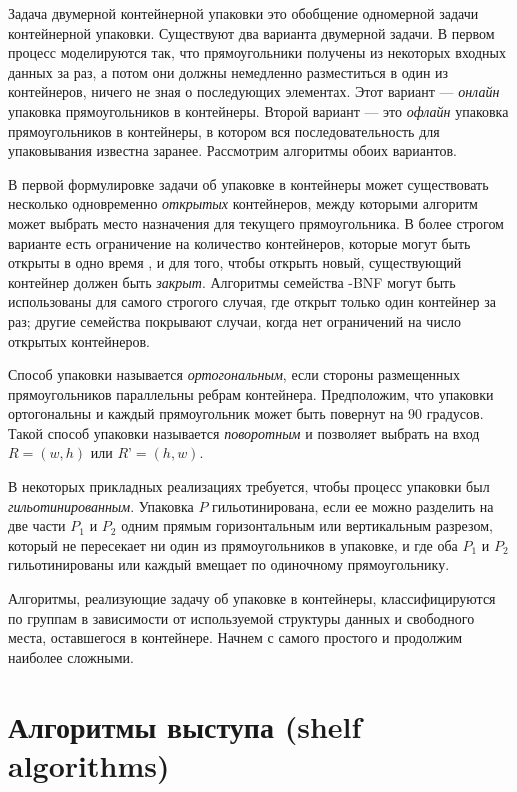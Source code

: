 \documentclass[a4paper,12pt]{report}
\begin{document}
Задача двумерной контейнерной упаковки это обобщение одномерной задачи контейнерной упаковки. Существуют два варианта двумерной задачи. В первом процесс моделируются так, что прямоугольники получены из некоторых входных данных за раз, а потом они должны немедленно разместиться в один из контейнеров, ничего не зная о последующих элементах. Этот вариант — \textit{онлайн} упаковка прямоугольников в контейнеры. Второй вариант — это \textit{офлайн} упаковка прямоугольников в контейнеры, в котором вся последовательность для упаковывания известна заранее. Рассмотрим алгоритмы обоих вариантов.

В первой формулировке задачи об упаковке в контейнеры может существовать несколько одновременно \textit{открытых} контейнеров, между которыми  алгоритм может выбрать место назначения для текущего прямоугольника. В более строгом варианте есть ограничение на количество контейнеров, которые могут быть открыты в одно время , и для того, чтобы открыть новый, существующий контейнер должен быть \textit{закрыт}. Алгоритмы семейства -BNF могут быть использованы для самого строгого случая, где открыт только один контейнер за раз; другие семейства покрывают случаи, когда нет ограничений на число открытых контейнеров.

Способ упаковки называется \textit{ортогональным}, если стороны размещенных прямоугольников параллельны ребрам контейнера. Предположим, что упаковки ортогональны и каждый прямоугольник может быть повернут на 90 градусов. Такой способ упаковки называется \textit{поворотным} и позволяет выбрать на вход $R = (w, h)$ или $R’ = (h, w)$.

В некоторых прикладных реализациях требуется, чтобы процесс упаковки был \textit{гильотинированным}. Упаковка $P$ гильотинирована, если ее можно разделить на две части $P_1$ и $P_2$ одним прямым горизонтальным или вертикальным разрезом, который не пересекает ни один из прямоугольников в упаковке, и где оба $P_1$ и $P_2$ гильотинированы или каждый вмещает по одиночному прямоугольнику.

Алгоритмы, реализующие задачу об упаковке в контейнеры, классифицируются по группам в зависимости от используемой структуры данных  и свободного места, оставшегося в контейнере. Начнем с самого простого и продолжим наиболее сложными.

\section{Алгоритмы выступа (shelf algorithms)}
\end{document}
